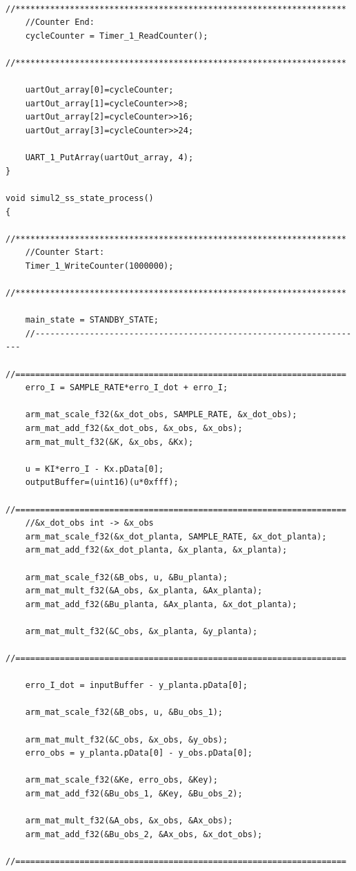 \documentclass[
	article,			%
	11pt,				%
	oneside,			%
	a4paper,			%
	english,			%
	brazil,				%
	sumario=tradicional
	]{abntex2}
\begin{document}
\begin{apendicesenv}
\begin{lstlisting}
    //*******************************************************************
    //Counter End:
    cycleCounter = Timer_1_ReadCounter(); 
    //*******************************************************************    
    
    uartOut_array[0]=cycleCounter;
    uartOut_array[1]=cycleCounter>>8;
    uartOut_array[2]=cycleCounter>>16;
    uartOut_array[3]=cycleCounter>>24;
    
    UART_1_PutArray(uartOut_array, 4);     
}

void simul2_ss_state_process()
{
    //*******************************************************************
    //Counter Start:
    Timer_1_WriteCounter(1000000);
    //*******************************************************************
    
    main_state = STANDBY_STATE;      
    //-------------------------------------------------------------------
    //===================================================================          
    erro_I = SAMPLE_RATE*erro_I_dot + erro_I;
    
    arm_mat_scale_f32(&x_dot_obs, SAMPLE_RATE, &x_dot_obs);
    arm_mat_add_f32(&x_dot_obs, &x_obs, &x_obs);
    arm_mat_mult_f32(&K, &x_obs, &Kx);
       
    u = KI*erro_I - Kx.pData[0];   
    outputBuffer=(uint16)(u*0xfff); 
    //===================================================================  
    //&x_dot_obs int -> &x_obs
    arm_mat_scale_f32(&x_dot_planta, SAMPLE_RATE, &x_dot_planta);
    arm_mat_add_f32(&x_dot_planta, &x_planta, &x_planta);
    
    arm_mat_scale_f32(&B_obs, u, &Bu_planta);   
    arm_mat_mult_f32(&A_obs, &x_planta, &Ax_planta);  
    arm_mat_add_f32(&Bu_planta, &Ax_planta, &x_dot_planta);
    
    arm_mat_mult_f32(&C_obs, &x_planta, &y_planta);
    //===================================================================  
    
    erro_I_dot = inputBuffer - y_planta.pData[0];
    
    arm_mat_scale_f32(&B_obs, u, &Bu_obs_1);
    
    arm_mat_mult_f32(&C_obs, &x_obs, &y_obs);
    erro_obs = y_planta.pData[0] - y_obs.pData[0];
    
    arm_mat_scale_f32(&Ke, erro_obs, &Key);
    arm_mat_add_f32(&Bu_obs_1, &Key, &Bu_obs_2);
    
    arm_mat_mult_f32(&A_obs, &x_obs, &Ax_obs);
    arm_mat_add_f32(&Bu_obs_2, &Ax_obs, &x_dot_obs); 
    //===================================================================   
    

\end{lstlisting}
\end{apendicesenv}
\end{document}
